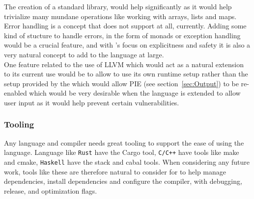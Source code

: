 The creation of a standard library, would help \lang{} significantly as it would help
trivialize many mundane operations like working with arrays, lists and maps. \\

Error handling is a concept that \lang{} does not support at all, currently.
Adding some kind of stucture to handle errors, in the form of monads or exception
handling would be a crucial feature, and with \lang's focus on explicitness and
safety it is also a very natural concept to add to the language at large.\\

One feature related to the use of LLVM which would act as a natural extension to its
current use would be to allow \lang{} to use its own runtime setup rather than the
setup provided by the \gcc{} which would allow PIE (see section~\ref{sec:Output}) to be
re-enabled which would be very desirable when the language is extended to allow user
input as it would help prevent certain vulnerabilities.

\subsubsection{Tooling} \label{sec:tooling}

Any language and compiler needs great tooling to support the ease of using the
language. Language like \texttt{Rust} have the Cargo tool, \texttt{C/C++} have tools like make
and cmake, \texttt{Haskell} have the stack and cabal tools. When considering any
future work, tools like these are therefore natural to consider for \lang{} to help
manage dependencies, install dependencies and configure the compiler, with debugging,
release, and optimization flags. 

